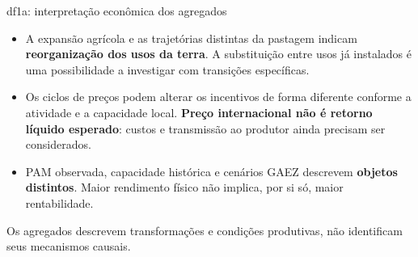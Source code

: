 \documentclass[aspectratio=169,11pt]{beamer}
\newcommand{\fonte}[1]{\par\vfill{\fontsize{7.5}{9}\selectfont\color{gray}#1\par}}
\begin{document}
\begin{frame}{df1a: interpretação econômica dos agregados}
\begin{itemize}
\setlength{\itemsep}{4mm}
\item A expansão agrícola e as trajetórias distintas da pastagem indicam \textbf{reorganização dos usos da terra}. A substituição entre usos já instalados é uma possibilidade a investigar com transições específicas.
\item Os ciclos de preços podem alterar os incentivos de forma diferente conforme a atividade e a capacidade local. \textbf{Preço internacional não é retorno líquido esperado}: custos e transmissão ao produtor ainda precisam ser considerados.
\item PAM observada, capacidade histórica e cenários GAEZ descrevem \textbf{objetos distintos}. Maior rendimento físico não implica, por si só, maior rentabilidade.
\end{itemize}
\fonte{Os agregados descrevem transformações e condições produtivas, não identificam seus mecanismos causais.}
\end{frame}

\end{document}
